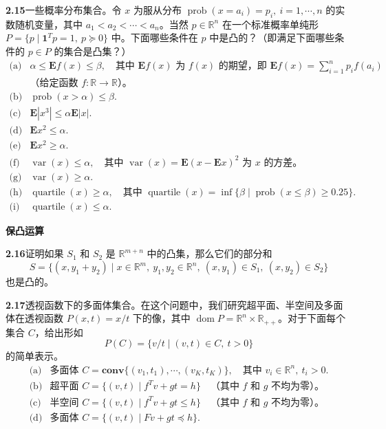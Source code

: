 \documentclass[UTF8, 12pt, fontset=fandol, oneside]{ctexart}
\begin{document}
\noindent\textbf{2.15}\quad 一些概率分布集合。令 $x$ 为服从分布 $\operatorname{prob}(x=a_i)=p_i,\ i=1,\cdots,n$ 的实数随机变量，其中 $a_1<a_2<\cdots<a_n$。当然 $p\in\mathbb{R}^n$ 在一个标准概率单纯形 $P=\{p\mid \mathbf{1}^Tp=1,\ p\succeq0\}$ 中。下面哪些条件在 $p$ 中是凸的？（即满足下面哪些条件的 $p\in P$ 的集合是凸集？）
\[
  \begin{array}{ll}
  \text{(a)} & \alpha\le \mathbf{E}f(x)\le\beta,\quad
    \text{其中 }\mathbf{E}f(x)\text{ 为 }f(x)\text{ 的期望，即 }\mathbf{E}f(x)=\sum_{i=1}^n p_if(a_i)\\
  & \text{（给定函数 }f:\mathbb{R}\to\mathbb{R}\text{）。}\\[0.3em]
  \text{(b)} & \operatorname{prob}(x>\alpha)\le\beta.\\
  \text{(c)} & \mathbf{E}|x^3|\le\alpha\mathbf{E}|x|.\\
  \text{(d)} & \mathbf{E}x^2\le\alpha.\\
  \text{(e)} & \mathbf{E}x^2\ge\alpha.\\
  \text{(f)} & \operatorname{var}(x)\le\alpha,\quad \text{其中 }\operatorname{var}(x)=\mathbf{E}(x-\mathbf{E}x)^2\text{ 为 }x\text{ 的方差。}\\
  \text{(g)} & \operatorname{var}(x)\ge\alpha.\\
  \text{(h)} & \operatorname{quartile}(x)\ge\alpha,\quad \text{其中 }\operatorname{quartile}(x)=\inf\{\beta\mid \operatorname{prob}(x\le\beta)\ge0.25\}.\\
  \text{(i)} & \operatorname{quartile}(x)\le\alpha.
  \end{array}
\]

\noindent\textbf{保凸运算}

\noindent\textbf{2.16}\quad 证明如果 $S_1$ 和 $S_2$ 是 $\mathbb{R}^{m+n}$ 中的凸集，那么它们的部分和
\[
  S=\{(x,y_1+y_2)\mid x\in\mathbb{R}^m,\ y_1,y_2\in\mathbb{R}^n,\ (x,y_1)\in S_1,\ (x,y_2)\in S_2\}
\]
也是凸的。

\noindent\textbf{2.17}\quad 透视函数下的多面体集合。在这个问题中，我们研究超平面、半空间及多面体在透视函数 $P(x,t)=x/t$ 下的像，其中 $\operatorname{dom}P=\mathbb{R}^n\times\mathbb{R}_{++}$。对于下面每个集合 $C$，给出形如
\[
  P(C)=\{v/t\mid (v,t)\in C,\ t>0\}
\]
的简单表示。
\[
  \begin{array}{ll}
  \text{(a)} & \text{多面体 }C=\mathbf{conv}\{(v_1,t_1),\cdots,(v_K,t_K)\},\quad \text{其中 }v_i\in\mathbb{R}^n,\ t_i>0.\\[0.3em]
  \text{(b)} & \text{超平面 }C=\{(v,t)\mid f^Tv+gt=h\}\quad \text{（其中 }f\text{ 和 }g\text{ 不均为零）。}\\[0.3em]
  \text{(c)} & \text{半空间 }C=\{(v,t)\mid f^Tv+gt\le h\}\quad \text{（其中 }f\text{ 和 }g\text{ 不均为零）。}\\[0.3em]
  \text{(d)} & \text{多面体 }C=\{(v,t)\mid Fv+gt\preceq h\}.
  \end{array}
\]
\end{document}
